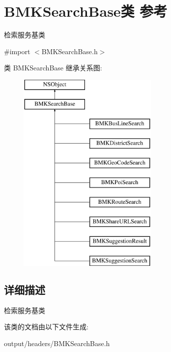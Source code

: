 \hypertarget{interface_b_m_k_search_base}{}\section{B\+M\+K\+Search\+Base类 参考}
\label{interface_b_m_k_search_base}


检索服务基类  




{\ttfamily \#import $<$B\+M\+K\+Search\+Base.\+h$>$}

类 B\+M\+K\+Search\+Base 继承关系图\+:\begin{figure}[H]
\begin{center}
\leavevmode
\includegraphics[height=10.000000cm]{interface_b_m_k_search_base}
\end{center}
\end{figure}


\subsection{详细描述}
检索服务基类 

该类的文档由以下文件生成\+:\begin{DoxyCompactItemize}
\item 
output/headers/B\+M\+K\+Search\+Base.\+h\end{DoxyCompactItemize}
